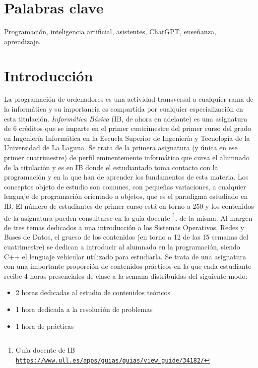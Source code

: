 \documentclass[twocolumn,twoside,a4paper, 10pt]{article}
\begin{document}
\section*{Palabras clave}
\noindent Programación, inteligencia artificial, asistentes, ChatGPT, enseñanza, aprendizaje.

\section{Introducción}
La programación de ordenadores es una actividad transversal a cualquier rama de la informática y su
importancia es compartida por cualquier especialización en esta titulación.
\textit{Informática Básica} 
(IB, de ahora en adelante) 
es una asignatura de 6 créditos que se imparte en el primer cuatrimestre 
del primer curso del grado en Ingeniería Informática en la Escuela Superior de Ingeniería y Tecnología de la Universidad de La Laguna.
Se trata de la primera asignatura (y única en ese primer cuatrimestre) de perfil eminentemente informático que
cursa el alumnado de la titulación y es en IB donde el estudiantado toma
contacto con la programación y en la que han de aprender los fundamentos de esta materia.
Los conceptos objeto de estudio son comunes, con pequeñas variaciones, a cualquier lenguaje de programación
orientado a objetos, que es el paradigma estudiado en IB.
El número de estudiantes de primer curso está en torno a 250 y los contenidos de la asignatura pueden 
consultarse en la guía docente
\footnote{Guía docente de IB\\ \href{https://www.ull.es/apps/guias/guias/view_guide/34182/}{\scriptsize{\texttt{https://www.ull.es/apps/guias/guias/view\_guide/34182/}}}}.
de la misma.
Al margen de tres temas dedicados a una introducción a los Sistemas Operativos, Redes y Bases de Datos,
el grueso de los contenidos (en torno a 12 de las 15 semanas del cuatrimestre) se dedican a introducir al
alumnado en la programación, siendo C++ el lenguaje vehicular utilizado para estudiarla.
Se trata de una asignatura con una importante proporción de contenidos prácticos en la que cada estudiante
recibe 4 horas presenciales de clase a la semana distribuídas del siguiente modo:
\begin{itemize}
  \item 2 horas dedicadas al estudio de contenidos teóricos
  \item 1 hora dedicada a la resolución de problemas
  \item 1 hora de prácticas
\end{itemize}
\end{document}
